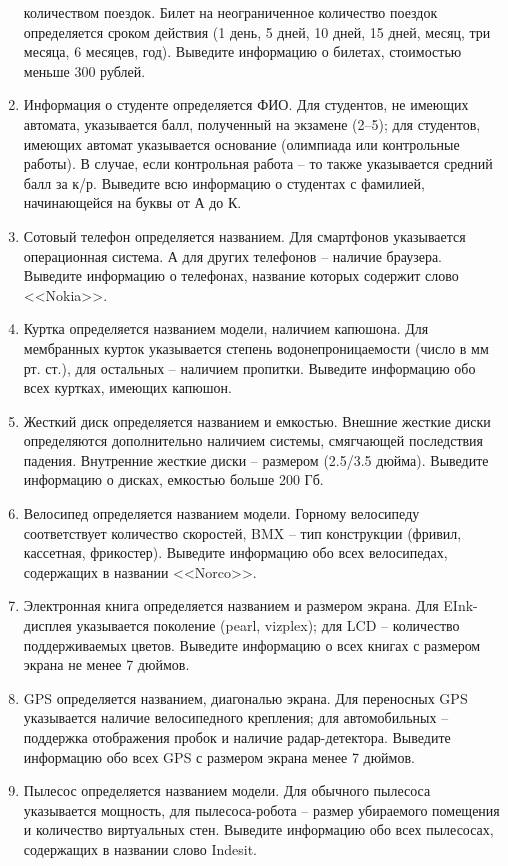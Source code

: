 \begin{enumerate}
количеством поездок. Билет на неограниченное количество поездок
определяется сроком действия (1 день, 5 дней, 10 дней, 15 дней, месяц, три месяца, 6 месяцев, год).
Выведите информацию о билетах, стоимостью меньше 300 рублей.
\item Информация о студенте определяется ФИО. Для студентов, не имеющих автомата, указывается балл,
полученный на экзамене (2--5); для студентов, имеющих автомат указывается основание (олимпиада или контрольные работы).
В случае, если контрольная работа -- то также указывается средний балл за к/р.
Выведите всю информацию о студентах с фамилией, начинающейся на буквы от А до К.
\item Сотовый телефон определяется названием. Для смартфонов указывается операционная система. А для других телефонов
-- наличие браузера. Выведите информацию  о телефонах, название которых содержит слово <<Nokia>>.

\item Куртка определяется названием модели, наличием капюшона. 
Для мембранных курток указывается степень водонепроницаемости 
(число в мм рт. ст.), для остальных -- наличием пропитки.
Выведите информацию обо всех куртках, имеющих капюшон.

\item Жесткий диск определяется названием и емкостью. Внешние жесткие диски определяются дополнительно
наличием системы, смягчающей последствия падения. Внутренние жесткие диски -- размером (2.5/3.5 дюйма).
Выведите информацию о дисках, емкостью больше 200 Гб.

\item Велосипед определяется названием модели. Горному велосипеду соответствует количество скоростей, BMX -- тип
конструкции (фривил, кассетная, фрикостер). Выведите информацию обо всех велосипедах,
содержащих в названии <<Norco>>.

\item Электронная книга определяется названием и размером экрана. Для EInk-дисплея указывается поколение
(pearl, vizplex); для LCD -- количество поддерживаемых цветов. Выведите информацию о всех книгах с размером экрана
не менее  7 дюймов.

\item GPS определяется названием, диагональю экрана. Для переносных GPS указывается наличие велосипедного
крепления; для автомобильных -- поддержка отображения пробок и наличие радар-детектора.
Выведите информацию обо всех GPS с размером экрана менее 7 дюймов.

\item Пылесос определяется названием модели. Для обычного пылесоса указывается мощность, для пылесоса-робота --
размер убираемого помещения и количество виртуальных стен. Выведите информацию обо всех пылесосах,
содержащих в названии слово Indesit.



\end{enumerate}
